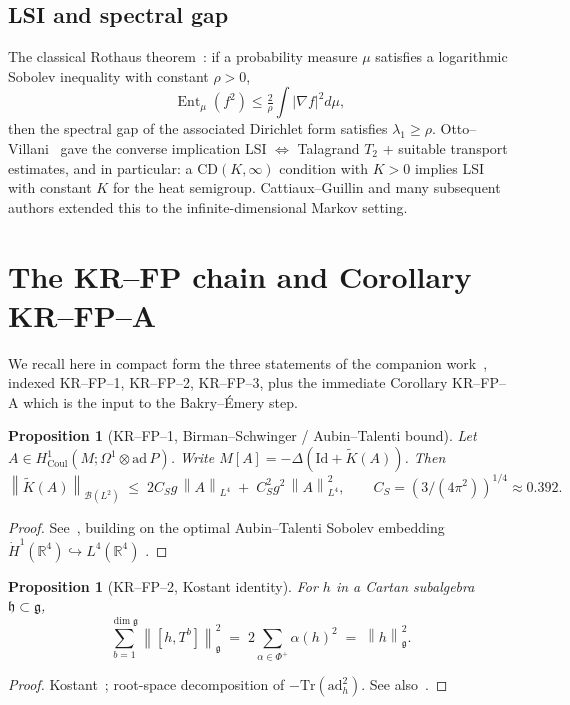\documentclass[11pt,a4paper]{amsart}
\newtheorem{proposition}[theorem]{Proposition}
\theoremstyle{definition}
\newcommand{\R}{\mathbb{R}}
\newcommand{\gfrak}{\mathfrak{g}}
\newcommand{\hfrak}{\mathfrak{h}}
\newcommand{\norm}[1]{\left\lVert#1\right\rVert}
\newcommand{\abs}[1]{\left\lvert#1\right\rvert}
\newcommand{\Tr}{\mathrm{Tr}}
\newcommand{\ad}{\mathrm{ad}}
\newcommand{\Coul}{\mathrm{Coul}}
\DeclareMathOperator{\Ent}{Ent}
\begin{document}
\subsection{LSI and spectral gap}
The classical Rothaus theorem~\cite{Rothaus1981}: if a probability measure
$\mu$ satisfies a logarithmic Sobolev inequality with constant $\rho>0$,
$$
\Ent_\mu(f^2) \leq \tfrac{2}{\rho}\int \abs{\nabla f}^2 d\mu,
$$
then the spectral gap of the associated Dirichlet form satisfies
$\lambda_1 \geq \rho$. Otto--Villani~\cite{OttoVillani2000} gave the converse
implication LSI $\Leftrightarrow$ Talagrand $T_2$ + suitable transport
estimates, and in particular: a $\mathrm{CD}(K,\infty)$ condition with
$K > 0$ implies LSI with constant $K$ for the heat semigroup. Cattiaux--Guillin
and many subsequent authors extended this to the infinite-dimensional Markov
setting.

\section{The KR--FP chain and Corollary KR--FP--A}\label{sec:KRFPchain}

We recall here in compact form the three statements of the companion
work~\cite{RemondiereKRFP3_2026}, indexed KR--FP--1, KR--FP--2, KR--FP--3,
plus the immediate Corollary KR--FP--A which is the input to the
Bakry--\'Emery step.

\begin{proposition}[KR--FP--1, Birman--Schwinger / Aubin--Talenti bound]
\label{prop:KRFP1}
Let $A \in H^1_{\Coul}(M; \Omega^1\otimes\mathrm{ad}\,P)$. Write
$M[A] = -\Delta(\mathrm{Id} + \widetilde K(A))$. Then
$$
\norm{\widetilde K(A)}_{\mathcal B(L^2)}
\;\leq\; 2 C_S g\,\norm{A}_{L^4}
\;+\; C_S^2 g^2\,\norm{A}_{L^4}^2,
\qquad C_S = (3/(4\pi^2))^{1/4} \approx 0.392.
$$
\end{proposition}
\begin{proof}
See~\cite[Lemma~4.1 (Birman--Schwinger)]{RemondiereKRFP3_2026}, building on
the optimal Aubin--Talenti Sobolev embedding
$\dot H^1(\R^4) \hookrightarrow L^4(\R^4)$ \cite{Aubin1976,Talenti1976}.
\end{proof}

\begin{proposition}[KR--FP--2, Kostant identity]\label{prop:KRFP2}
For $h$ in a Cartan subalgebra $\hfrak \subset \gfrak$,
$$
\sum_{b=1}^{\dim\gfrak} \norm{[h,T^b]}_\gfrak^2
\;=\; 2\sum_{\alpha\in\Phi^+}\alpha(h)^2
\;=\; \norm{h}_\gfrak^2.
$$
\end{proposition}
\begin{proof}
Kostant~\cite[\S 5]{Kostant1959}; root-space decomposition of
$-\Tr(\ad_h^2)$. See also~\cite[Proposition~2.3 (Kostant)]{RemondiereKRFP3_2026}.
\end{proof}
\end{document}
